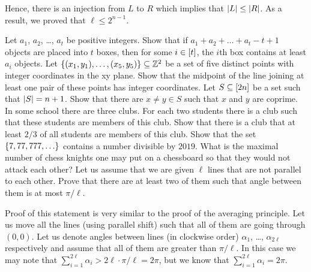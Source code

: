 \begin{chapterendexercises}
\begin{solution}
      Hence, there is an injection from $L$ to $R$ which implies that
      $\left|{L}\right| \le \left|{R}\right|$.
      As a result, we proved that $\ell \le 2^{n - 1}$.
    \end{solution}
  \exercise[recommended] Let $a_1$, $a_2$, \dots, $a_t$ be positive integers. Show that
    if $a_1 + a_2 + \dots + a_t - t + 1$ objects are placed into $t$ boxes,
    then for some $i \in {[{t}]}$, the $i$th box contains at least $a_i$ objects.
  \exercise Let $\set{(x_1,y_1), \dots, (x_5, y_5)} \subseteq \Z^2$ be a
    set of five distinct points with integer coordinates in the xy plane. Show
    that the midpoint of the line joining at least one pair of these points has
    integer coordinates.
  \exercise Let $S \subseteq {[{2n}]}$ be a set such that 
    $\left|{S}\right| = n + 1$. Show
    that there are $x \neq y \in S$ such that $x$ and $y$ are coprime.
  \exercise[recommended] In some school there are three clubs. For each two
    students there is a club such that these students are  members of this club.
    Show that there is a club that at least $2 / 3$ of all students are members
    of this club.
  \exercise Show that the set $\set{7, 77, 777, \dots}$ contains a number
    divisible by $2019$.
  \exercise What is the maximal number of chess knights one may put on a
    chessboard so that they would not attack each other?
  \exercise[recommended] Let us assume that we are given $\ell$ lines that are
    not parallel to each other. Prove that there are at least two of them such
    that angle between them is at most $\pi / \ell$.
    \begin{solution}
      Proof of this statement is very similar to the proof of the averaging
      principle.
      Let us move all the lines (using parallel shift) such that all of them are
      going through $(0, 0)$. Let us denote angles between lines (in clockwise
      order) $\alpha_1$, \dots, $\alpha_{2\ell}$ respectively and assume that
      all of them are greater than $\pi / \ell$. In this case we may note that
      $\sum\limits_{i = 1}^{2\ell} \alpha_i > 2\ell \cdot \pi / \ell = 2\pi$,
      but we know that $\sum\limits_{i = 1}^{2\ell} \alpha_i  = 2\pi$.
    \end{solution}
\end{chapterendexercises}
